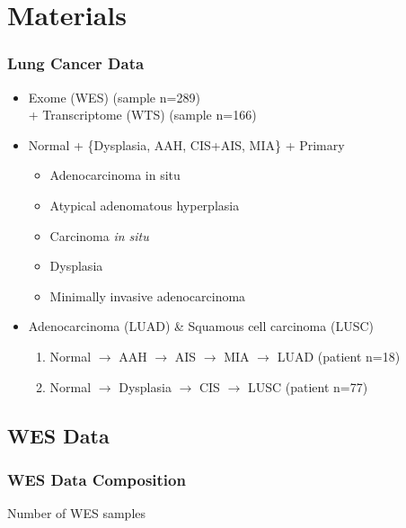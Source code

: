 \documentclass{beamer}
\begin{document}
    \section{Materials}
    \begin{frame}
        \frametitle{Lung Cancer Data}

        \begin{itemize}
            \item Exome (WES) (sample n=289) \\
                + Transcriptome (WTS) (sample n=166)
            \item Normal + \{Dysplasia, AAH, CIS+AIS, MIA\} + Primary
            \begin{itemize}
                \item Adenocarcinoma in situ
                \item Atypical adenomatous hyperplasia
                \item Carcinoma \textit{in situ}
                \item Dysplasia
                \item Minimally invasive adenocarcinoma
            \end{itemize}
            \item Adenocarcinoma (LUAD) \& Squamous cell carcinoma (LUSC)
            \begin{enumerate}
                \item Normal $\rightarrow$ AAH $\rightarrow$ AIS $\rightarrow$ MIA $\rightarrow$ LUAD (patient n=18)
                \item Normal $\rightarrow$ Dysplasia $\rightarrow$ CIS $\rightarrow$ LUSC (patient n=77)
            \end{enumerate}
        \end{itemize}
    \end{frame}

    \subsection{WES Data}
    \begin{frame}
        \frametitle{WES Data Composition}

        \begin{table}
            \caption{Number of WES samples}
            \resizebox{!}{0.3 \textheight}
            {}
        \end{table}
    \end{frame}
\end{document}
